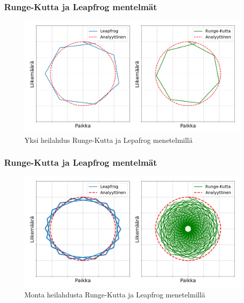 \documentclass[finnish, 11pt, fleqn]{beamer}
\begin{document}
\begin{frame}
	\frametitle{Runge-Kutta ja Leapfrog mentelmät}
	\vspace{-1em}
	\begin{figure}[h!]
		\includegraphics[scale=0.27]{graphics/comp3.png}	
		{\caption{Yksi heilahdus Runge-Kutta ja Lepafrog menetelmillä}}
	\end{figure}
\end{frame}

\begin{frame}
	\frametitle{Runge-Kutta ja Leapfrog mentelmät}
	\vspace{-1em}
	\begin{figure}[h!]
		\includegraphics[scale=0.27]{graphics/comp4.png}	
		{\caption{Monta heilahdusta Runge-Kutta ja Leapfrog menetelmillä}}
	\end{figure}
\end{frame}
\end{document}
